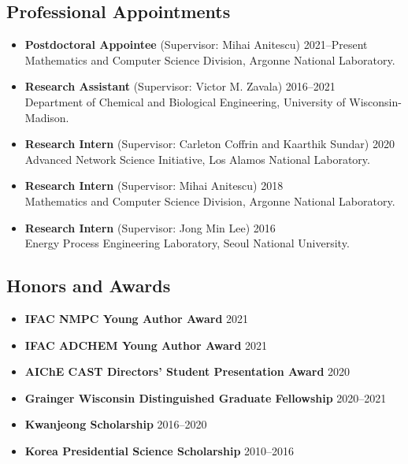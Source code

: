 \documentclass[letterpaper, 11pt]{article}
\begin{document}
\subsection*{Professional Appointments}
\begin{itemize}[leftmargin=*,itemsep=0em]
\item[] {\bf Postdoctoral Appointee} (Supervisor: Mihai Anitescu) \hfill 2021--Present\\
  Mathematics and Computer Science Division, Argonne National Laboratory. 
\item[] {\bf Research Assistant} (Supervisor: Victor M. Zavala) \hfill 2016--2021 \\
  Department of Chemical and Biological Engineering, University of Wisconsin-Madison. 
\item[] {\bf Research Intern} (Supervisor: Carleton Coffrin and Kaarthik Sundar) \hfill 2020\\
  Advanced Network Science Initiative, Los Alamos National Laboratory. 
\item[] {\bf Research Intern} (Supervisor: Mihai Anitescu) \hfill 2018 \\
  Mathematics and Computer Science Division, Argonne National Laboratory.
\item[] {\bf Research Intern} (Supervisor: Jong Min Lee) \hfill 2016 \\
  Energy Process Engineering Laboratory, Seoul National University.
\end{itemize}

\subsection*{Honors and Awards}
\begin{itemize}[leftmargin=*,itemsep=0em]
\item[] {\bf IFAC NMPC Young Author Award} \hfill 2021
\item[] {\bf IFAC ADCHEM Young Author Award} \hfill 2021
\item[] {\bf AIChE CAST Directors' Student Presentation Award} \hfill 2020
\item[] {\bf Grainger Wisconsin Distinguished Graduate Fellowship} \hfill 2020--2021
\item[] {\bf Kwanjeong Scholarship} \hfill 2016--2020
\item[] {\bf Korea Presidential Science Scholarship} \hfill 2010--2016
\end{itemize}

\let\OLDthebibliography\thebibliography
\renewcommand\thebibliography[1]{
  \OLDthebibliography{#1}
  \setlength{\parskip}{0pt}
  \setlength{\itemsep}{0pt}
}
\end{document}
